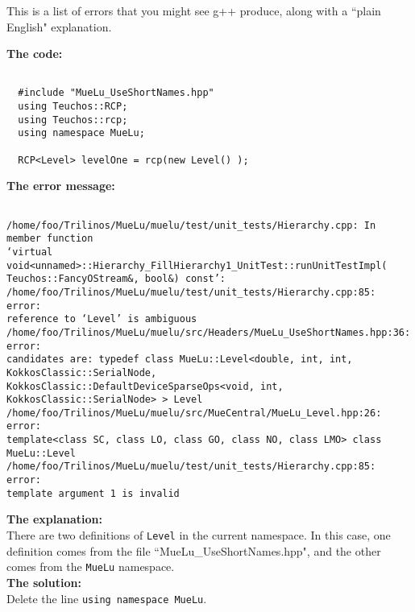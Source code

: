This is a list of errors that you might see g++ produce, along with a ``plain English" explanation.

\be
\item {\bf The code:}
\begin{verbatim}

  #include "MueLu_UseShortNames.hpp"
  using Teuchos::RCP;
  using Teuchos::rcp;
  using namespace MueLu;

  RCP<Level> levelOne = rcp(new Level() );
\end{verbatim}
{\bf The error message:}
\begin{verbatim}

/home/foo/Trilinos/MueLu/muelu/test/unit_tests/Hierarchy.cpp: In member function
‘virtual void<unnamed>::Hierarchy_FillHierarchy1_UnitTest::runUnitTestImpl(
Teuchos::FancyOStream&, bool&) const’:
/home/foo/Trilinos/MueLu/muelu/test/unit_tests/Hierarchy.cpp:85: error:
reference to ‘Level’ is ambiguous
/home/foo/Trilinos/MueLu/muelu/src/Headers/MueLu_UseShortNames.hpp:36: error:
candidates are: typedef class MueLu::Level<double, int, int, KokkosClassic::SerialNode,
KokkosClassic::DefaultDeviceSparseOps<void, int, KokkosClassic::SerialNode> > Level
/home/foo/Trilinos/MueLu/muelu/src/MueCentral/MueLu_Level.hpp:26: error:
template<class SC, class LO, class GO, class NO, class LMO> class MueLu::Level
/home/foo/Trilinos/MueLu/muelu/test/unit_tests/Hierarchy.cpp:85: error:
template argument 1 is invalid
\end{verbatim}
{\bf The explanation:}\\
There are two definitions of \verb!Level! in the current namespace.  In this case, one definition comes from the
file ``MueLu\_UseShortNames.hpp", and the other comes from the \verb!MueLu! namespace.\\
{\bf The solution:}\\
Delete the line \verb!using namespace MueLu!.
\ee
